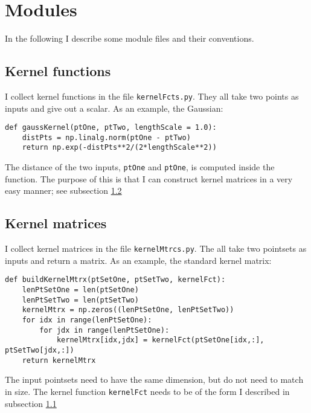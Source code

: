 \documentclass[12pt]{article}
\begin{document}
\section{Modules}

In the following I describe some module files and their conventions.



\subsection{Kernel functions}
	\label{subsec:kernelFcts}
I collect kernel functions in the file \texttt{kernelFcts.py}. They all take two points as inputs and give out a scalar. As an example, the Gaussian:
\begin{Verbatim}[formatcom=\color{blue!50!black}]
def gaussKernel(ptOne, ptTwo, lengthScale = 1.0):
    distPts = np.linalg.norm(ptOne - ptTwo)
    return np.exp(-distPts**2/(2*lengthScale**2))
\end{Verbatim}

The distance of the two inputs, \texttt{ptOne} and \texttt{ptOne}, is computed inside the function. The purpose of this is that I can construct kernel matrices in a very easy manner; see subsection \ref{subsec:kernelMtrcs}

\subsection{Kernel matrices}
\label{subsec:kernelMtrcs}
I collect kernel matrices in the file \texttt{kernelMtrcs.py}. The all take two pointsets as inputs and return a matrix. As an example, the standard kernel matrix: 
\begin{Verbatim}[formatcom=\color{blue!50!black}]
def buildKernelMtrx(ptSetOne, ptSetTwo, kernelFct):
    lenPtSetOne = len(ptSetOne)
    lenPtSetTwo = len(ptSetTwo)
    kernelMtrx = np.zeros((lenPtSetOne, lenPtSetTwo))
    for idx in range(lenPtSetOne):
        for jdx in range(lenPtSetOne):
            kernelMtrx[idx,jdx] = kernelFct(ptSetOne[idx,:], ptSetTwo[jdx,:])
    return kernelMtrx
\end{Verbatim}

The input pointsets need to have the same dimension, but do not need to match in size. The kernel function \texttt{kernelFct} needs to be of the form I described in subsection \ref{subsec:kernelFcts}
\end{document}
